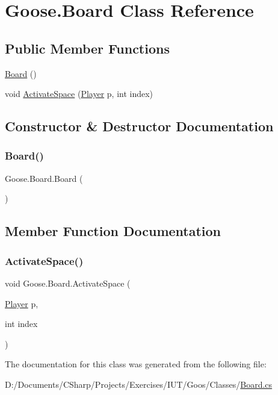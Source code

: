 \hypertarget{class_goose_1_1_board}{}\section{Goose.\+Board Class Reference}
\label{class_goose_1_1_board}
\subsection*{Public Member Functions}
\begin{DoxyCompactItemize}
\item 
\hyperlink{class_goose_1_1_board_adf308a2fc2492ab3484311eecca0cee2}{Board} ()
\item 
void \hyperlink{class_goose_1_1_board_aaa0fe6244bb20f1db24e3b3c3365ca4b}{Activate\+Space} (\hyperlink{class_goose_1_1_player}{Player} p, int index)
\end{DoxyCompactItemize}


\subsection{Constructor \& Destructor Documentation}
\mbox{\label{class_goose_1_1_board_adf308a2fc2492ab3484311eecca0cee2}} 
\subsubsection{\texorpdfstring{Board()}{Board()}}
{\footnotesize\ttfamily Goose.\+Board.\+Board (\begin{DoxyParamCaption}{ }\end{DoxyParamCaption})}



\subsection{Member Function Documentation}
\mbox{\label{class_goose_1_1_board_aaa0fe6244bb20f1db24e3b3c3365ca4b}} 
\subsubsection{\texorpdfstring{Activate\+Space()}{ActivateSpace()}}
{\footnotesize\ttfamily void Goose.\+Board.\+Activate\+Space (\begin{DoxyParamCaption}\item[{\hyperlink{class_goose_1_1_player}{Player}}]{p,  }\item[{int}]{index }\end{DoxyParamCaption})}



The documentation for this class was generated from the following file\+:\begin{DoxyCompactItemize}
\item 
D\+:/\+Documents/\+C\+Sharp/\+Projects/\+Exercises/\+I\+U\+T/\+Goos/\+Classes/\hyperlink{_board_8cs}{Board.\+cs}\end{DoxyCompactItemize}

